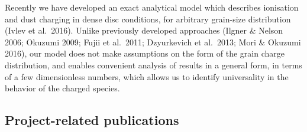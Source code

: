 \documentclass[10pt,fleqn,twoside]{article}
\begin{document}
Recently we have developed an exact analytical model which describes ionisation and dust charging in dense disc conditions,
for arbitrary grain-size distribution (Ivlev et al.\ 2016). Unlike previously developed approaches (Ilgner \& Nelson 2006; Okuzumi 2009; Fujii et al.\ 2011; Dzyurkevich et al.\ 2013; Mori \& Okuzumi 2016), our model does not make assumptions on the form of the grain charge distribution, and enables convenient analysis of results in a general form, in terms of a few dimensionless numbers, which allows us to identify universality in the behavior of the charged species.


\subsection{Project-related publications}
%
%
\end{document}

